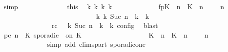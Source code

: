 \begin{isabellebody}
\ simp\isanewline
\isanewline
\ \ \ \ \ \ \ \ \ \ \ \ \isamarkupfalse%
\ this\ \isamarkupfalse%
\ {\isasymGamma}\isactrlsub k\ {\isasymPsi}\isactrlsub k\ {\isasymPhi}\isactrlsub k\ k\isanewline
\ \ \ \ \ \ \ \ \ \ \ \ \ fp{\isacharcolon}{\isacartoucheopen}{\isacharparenleft}{\isacharparenleft}{\isacharparenleft}{\isacharparenleft}K\ {\isasymUp}\ n{\isacharparenright}\ {\isacharhash}\ {\isacharparenleft}K\ {\isasymDown}\ n\ {\isacharat}\ {\isasymtau}{\isacharparenright}\ {\isacharhash}\ {\isasymGamma}{\isacharparenright}{\isacharcomma}\ n\ {\isasymturnstile}\ {\isasymPsi}\ {\isasymtriangleright}\ {\isasymPhi}{\isacharparenright}\isanewline
\ \ \ \ \ \ \ \ \ \ \ \ \ \ \ \ \ \ \ \ \ \ \ \ \ \ \ \ {\isasymhookrightarrow}\isactrlbsup k\isactrlesup \ {\isacharparenleft}{\isasymGamma}\isactrlsub k{\isacharcomma}\ Suc\ n\ {\isasymturnstile}\ {\isasymPsi}\isactrlsub k\ {\isasymtriangleright}\ {\isasymPhi}\isactrlsub k{\isacharparenright}{\isacharparenright}{\isacartoucheclose}\isanewline
\ \ \ \ \ \ \ \ \ \ \ \ \ \ \ rc{\isacharcolon}{\isacartoucheopen}{\isasymrho}\ {\isasymin}\ {\isasymlbrakk}\ {\isasymGamma}\isactrlsub k{\isacharcomma}\ Suc\ n\ {\isasymturnstile}\ {\isasymPsi}\isactrlsub k\ {\isasymtriangleright}\ {\isasymPhi}\isactrlsub k\ {\isasymrbrakk}\isactrlsub c\isactrlsub o\isactrlsub n\isactrlsub f\isactrlsub i\isactrlsub g{\isacartoucheclose}\ \isamarkupfalse%
\ blast\isanewline
\ \ \ \ \ \ \ \ \ \ \ \ \isamarkupfalse%
\ pc{\isacharcolon}{\isacartoucheopen}{\isacharparenleft}{\isasymGamma}{\isacharcomma}\ n\ {\isasymturnstile}\ {\isacharparenleft}{\isacharparenleft}K\ sporadic\ {\isasymtau}\ on\ K\ {\isacharhash}\ {\isasymPsi}{\isacharparenright}\ {\isasymtriangleright}\ {\isasymPhi}{\isacharparenright}\isanewline
\ \ \ \ \ \ \ \ \ \ \ \ \ \ {\isasymhookrightarrow}\ {\isacharparenleft}{\isacharparenleft}{\isacharparenleft}K\ {\isasymUp}\ n{\isacharparenright}\ {\isacharhash}\ {\isacharparenleft}K\ {\isasymDown}\ n\ {\isacharat}\ {\isasymtau}{\isacharparenright}\ {\isacharhash}\ {\isasymGamma}{\isacharparenright}{\isacharcomma}\ n\ {\isasymturnstile}\ {\isasymPsi}\ {\isasymtriangleright}\ {\isasymPhi}{\isacharparenright}{\isacartoucheclose}\isanewline
\ \ \ \ \ \ \ \ \ \ \ \ \isamarkupfalse%
\ {\isacharparenleft}simp\ add{\isacharcolon}\ elims{\isacharunderscore}part\ sporadic{\isacharunderscore}on{\isacharunderscore}e{}{\isacharparenright}\isanewline

\end{isabellebody}
